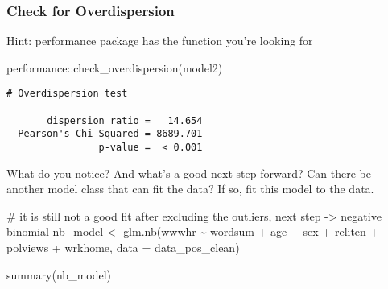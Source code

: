 \documentclass[
  letterpaper,
  DIV=11,
  numbers=noendperiod]{scrartcl}
\newenvironment{Shaded}{\begin{snugshade}}{\end{snugshade}}
\newcommand{\AttributeTok}[1]{\textcolor[rgb]{0.40,0.45,0.13}{#1}}
\newcommand{\CommentTok}[1]{\textcolor[rgb]{0.37,0.37,0.37}{#1}}
\newcommand{\FunctionTok}[1]{\textcolor[rgb]{0.28,0.35,0.67}{#1}}
\newcommand{\NormalTok}[1]{\textcolor[rgb]{0.00,0.23,0.31}{#1}}
\newcommand{\OtherTok}[1]{\textcolor[rgb]{0.00,0.23,0.31}{#1}}
\newcommand{\SpecialCharTok}[1]{\textcolor[rgb]{0.37,0.37,0.37}{#1}}
\begin{document}
\subsubsection{Check for Overdispersion}\label{check-for-overdispersion}

Hint: performance package has the function you're looking for

\begin{Shaded}
\begin{Highlighting}[]
\NormalTok{performance}\SpecialCharTok{::}\FunctionTok{check\_overdispersion}\NormalTok{(model2)}
\end{Highlighting}
\end{Shaded}

\begin{verbatim}
# Overdispersion test

       dispersion ratio =   14.654
  Pearson's Chi-Squared = 8689.701
                p-value =  < 0.001
\end{verbatim}

What do you notice? And what's a good next step forward? Can there be
another model class that can fit the data? If so, fit this model to the
data.

\begin{Shaded}
\begin{Highlighting}[]
\CommentTok{\# it is still not a good fit after excluding the outliers, next step {-}\textgreater{} negative binomial}
\NormalTok{nb\_model }\OtherTok{\textless{}{-}} \FunctionTok{glm.nb}\NormalTok{(wwwhr }\SpecialCharTok{\textasciitilde{}}\NormalTok{ wordsum }\SpecialCharTok{+}\NormalTok{ age }\SpecialCharTok{+}\NormalTok{ sex }\SpecialCharTok{+}\NormalTok{ reliten }\SpecialCharTok{+}\NormalTok{ polviews }\SpecialCharTok{+}\NormalTok{ wrkhome, }
                   \AttributeTok{data =}\NormalTok{ data\_pos\_clean)}

\FunctionTok{summary}\NormalTok{(nb\_model)}
\end{Highlighting}
\end{Shaded}
\end{document}
